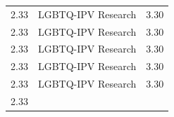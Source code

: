 \documentclass[]{tufte-handout}
\begin{document}
\begin{longtable}[]{@{}lll@{}}
\begin{minipage}[t]{0.09\columnwidth}
2.33\strut
\end{minipage} & \begin{minipage}[t]{0.27\columnwidth}\raggedright\strut
LGBTQ-IPV Research\strut
\end{minipage} & \begin{minipage}[t]{0.08\columnwidth}\raggedright\strut
3.30\strut
\end{minipage}\tabularnewline
\begin{minipage}[t]{0.09\columnwidth}\raggedright\strut
2.33\strut
\end{minipage} & \begin{minipage}[t]{0.27\columnwidth}\raggedright\strut
LGBTQ-IPV Research\strut
\end{minipage} & \begin{minipage}[t]{0.08\columnwidth}\raggedright\strut
3.30\strut
\end{minipage}\tabularnewline
\begin{minipage}[t]{0.09\columnwidth}\raggedright\strut
2.33\strut
\end{minipage} & \begin{minipage}[t]{0.27\columnwidth}\raggedright\strut
LGBTQ-IPV Research\strut
\end{minipage} & \begin{minipage}[t]{0.08\columnwidth}\raggedright\strut
3.30\strut
\end{minipage}\tabularnewline
\begin{minipage}[t]{0.09\columnwidth}\raggedright\strut
2.33\strut
\end{minipage} & \begin{minipage}[t]{0.27\columnwidth}\raggedright\strut
LGBTQ-IPV Research\strut
\end{minipage} & \begin{minipage}[t]{0.08\columnwidth}\raggedright\strut
3.30\strut
\end{minipage}\tabularnewline
\begin{minipage}[t]{0.09\columnwidth}\raggedright\strut
2.33\strut
\end{minipage} & \begin{minipage}[t]{0.27\columnwidth}\raggedright\strut
LGBTQ-IPV Research\strut
\end{minipage} & \begin{minipage}[t]{0.08\columnwidth}\raggedright\strut
3.30\strut
\end{minipage}\tabularnewline
\begin{minipage}[t]{0.09\columnwidth}\raggedright\strut
2.33\strut

\end{minipage}
\end{longtable}
\end{document}
